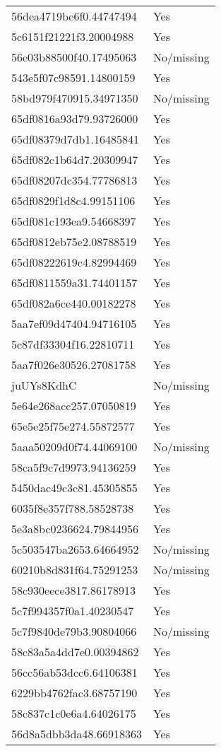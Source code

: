 \begin{tabular}{ll}
56dea4719be6f0.44747494 & Yes \\
5c6151f21221f3.20004988 & Yes \\
56e03b88500f40.17495063 & No/missing \\
543e5f07c98591.14800159 & Yes \\
58bd979f470915.34971350 & No/missing \\
65df0816a93d79.93726000 & Yes \\
65df08379d7db1.16485841 & Yes \\
65df082c1b64d7.20309947 & Yes \\
65df08207dc354.77786813 & Yes \\
65df0829f1d8c4.99151106 & Yes \\
65df081c193ea9.54668397 & Yes \\
65df0812eb75e2.08788519 & Yes \\
65df08222619c4.82994469 & Yes \\
65df0811559a31.74401157 & Yes \\
65df082a6ce440.00182278 & Yes \\
5aa7ef09d47404.94716105 & Yes \\
5c87df33304f16.22810711 & Yes \\
5aa7f026e30526.27081758 & Yes \\
juUYs8KdhC & No/missing \\
5e64e268acc257.07050819 & Yes \\
65e5e25f75e274.55872577 & Yes \\
5aaa50209d0f74.44069100 & No/missing \\
58ca5f9c7d9973.94136259 & Yes \\
5450dac49c3c81.45305855 & Yes \\
6035f8e357f788.58528738 & Yes \\
5e3a8bc0236624.79844956 & Yes \\
5c503547ba2653.64664952 & No/missing \\
60210b8d831f64.75291253 & No/missing \\
58c930eece3817.86178913 & Yes \\
5c7f994357f0a1.40230547 & Yes \\
5c7f9840de79b3.90804066 & No/missing \\
58c83a5a4dd7e0.00394862 & Yes \\
56cc56ab53dcc6.64106381 & Yes \\
6229bb4762fac3.68757190 & Yes \\
58c837c1c0e6a4.64026175 & Yes \\
56d8a5dbb3da48.66918363 & Yes \\

\end{tabular}
